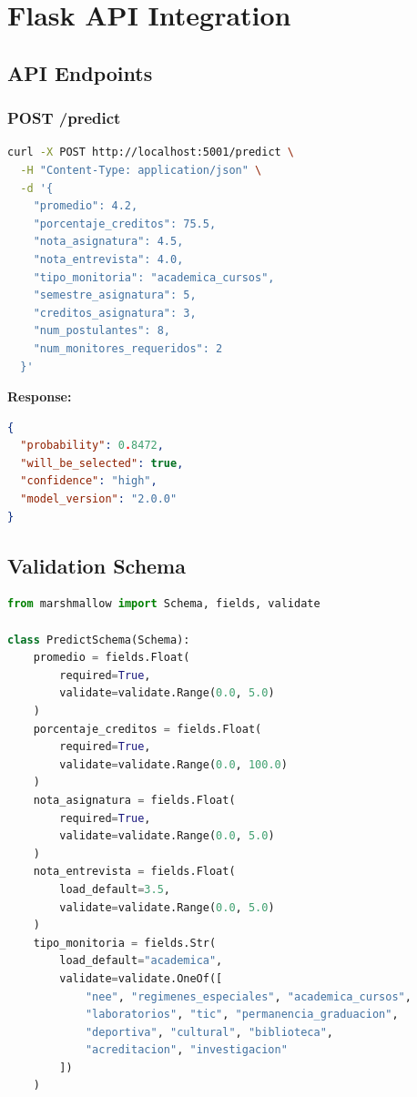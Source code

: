 \documentclass[12pt,a4paper]{report}
\begin{document}
\chapter{Flask API Integration}

\section{API Endpoints}

\subsection{POST /predict}

\begin{lstlisting}[language=bash, caption={API Request Example}]
curl -X POST http://localhost:5001/predict \
  -H "Content-Type: application/json" \
  -d '{
    "promedio": 4.2,
    "porcentaje_creditos": 75.5,
    "nota_asignatura": 4.5,
    "nota_entrevista": 4.0,
    "tipo_monitoria": "academica_cursos",
    "semestre_asignatura": 5,
    "creditos_asignatura": 3,
    "num_postulantes": 8,
    "num_monitores_requeridos": 2
  }'
\end{lstlisting}

\textbf{Response:}
\begin{lstlisting}[language=json]
{
  "probability": 0.8472,
  "will_be_selected": true,
  "confidence": "high",
  "model_version": "2.0.0"
}
\end{lstlisting}

\section{Validation Schema}

\begin{lstlisting}[language=Python, caption={Marshmallow Validation Schema}]
from marshmallow import Schema, fields, validate

class PredictSchema(Schema):
    promedio = fields.Float(
        required=True, 
        validate=validate.Range(0.0, 5.0)
    )
    porcentaje_creditos = fields.Float(
        required=True,
        validate=validate.Range(0.0, 100.0)
    )
    nota_asignatura = fields.Float(
        required=True,
        validate=validate.Range(0.0, 5.0)
    )
    nota_entrevista = fields.Float(
        load_default=3.5,
        validate=validate.Range(0.0, 5.0)
    )
    tipo_monitoria = fields.Str(
        load_default="academica",
        validate=validate.OneOf([
            "nee", "regimenes_especiales", "academica_cursos",
            "laboratorios", "tic", "permanencia_graduacion",
            "deportiva", "cultural", "biblioteca",
            "acreditacion", "investigacion"
        ])
    )
\end{lstlisting}
\end{document}
